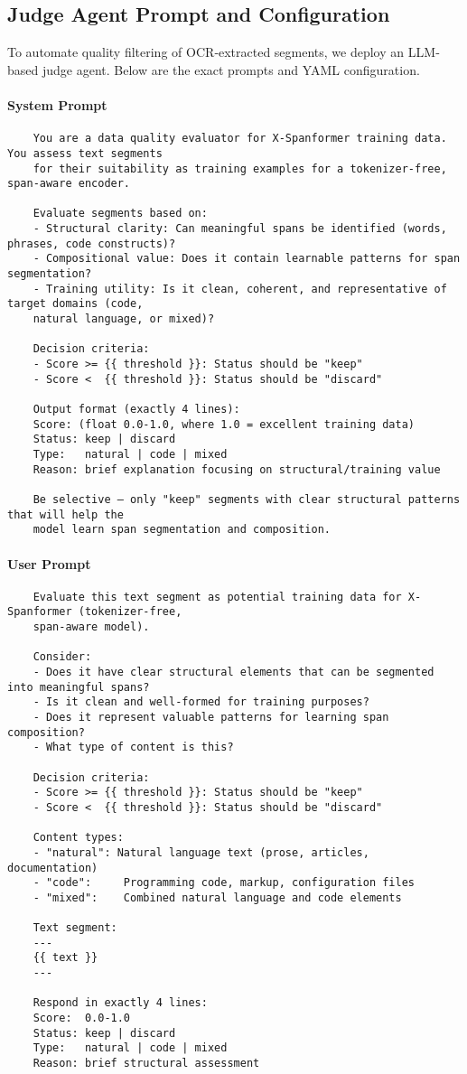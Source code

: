 \subsection{Judge Agent Prompt and Configuration}
\label{sec:judge-agent-config}

To automate quality filtering of OCR‐extracted segments, we deploy an LLM‐based judge agent. Below are the exact prompts and YAML configuration.

\paragraph{System Prompt}
\begin{verbatim}
	You are a data quality evaluator for X-Spanformer training data. You assess text segments
	for their suitability as training examples for a tokenizer-free, span-aware encoder.
	
	Evaluate segments based on:
	- Structural clarity: Can meaningful spans be identified (words, phrases, code constructs)?
	- Compositional value: Does it contain learnable patterns for span segmentation?
	- Training utility: Is it clean, coherent, and representative of target domains (code,
	natural language, or mixed)?
	
	Decision criteria:
	- Score >= {{ threshold }}: Status should be "keep"
	- Score <  {{ threshold }}: Status should be "discard"
	
	Output format (exactly 4 lines):
	Score: (float 0.0-1.0, where 1.0 = excellent training data)
	Status: keep | discard
	Type:   natural | code | mixed
	Reason: brief explanation focusing on structural/training value
	
	Be selective – only "keep" segments with clear structural patterns that will help the
	model learn span segmentation and composition.
\end{verbatim}

\paragraph{User Prompt}
\begin{verbatim}
	Evaluate this text segment as potential training data for X-Spanformer (tokenizer-free,
	span-aware model).
	
	Consider:
	- Does it have clear structural elements that can be segmented into meaningful spans?
	- Is it clean and well-formed for training purposes?
	- Does it represent valuable patterns for learning span composition?
	- What type of content is this?
	
	Decision criteria:
	- Score >= {{ threshold }}: Status should be "keep"
	- Score <  {{ threshold }}: Status should be "discard"
	
	Content types:
	- "natural": Natural language text (prose, articles, documentation)
	- "code":     Programming code, markup, configuration files
	- "mixed":    Combined natural language and code elements
	
	Text segment:
	---
	{{ text }}
	---
	
	Respond in exactly 4 lines:
	Score:  0.0-1.0
	Status: keep | discard
	Type:   natural | code | mixed
	Reason: brief structural assessment
\end{verbatim}


